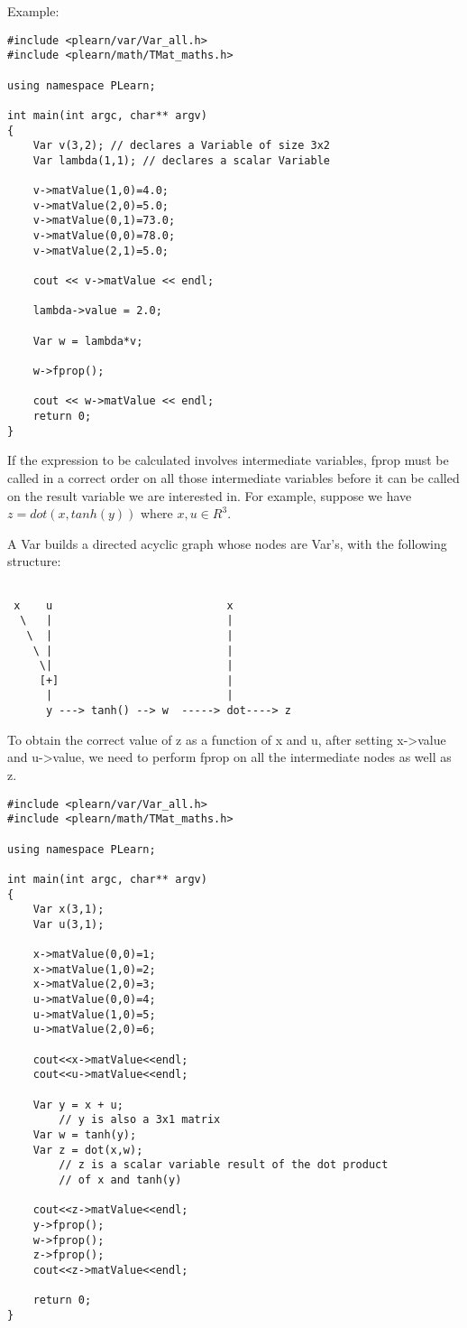 \documentclass[11pt]{book}
\begin{document}
 Example:

\begin{verbatim}
#include <plearn/var/Var_all.h>
#include <plearn/math/TMat_maths.h>

using namespace PLearn;

int main(int argc, char** argv)
{
    Var v(3,2); // declares a Variable of size 3x2
    Var lambda(1,1); // declares a scalar Variable

    v->matValue(1,0)=4.0;
    v->matValue(2,0)=5.0;
    v->matValue(0,1)=73.0;
    v->matValue(0,0)=78.0;
    v->matValue(2,1)=5.0;

    cout << v->matValue << endl;

    lambda->value = 2.0;

    Var w = lambda*v;

    w->fprop();

    cout << w->matValue << endl;
    return 0;
}
\end{verbatim}


If the expression to be calculated involves intermediate variables,
fprop must be called in a correct order on all those intermediate
variables before it can be called on the result variable we are
interested in. For example, suppose we have $z=dot(x,tanh(y))$ where
$x,u \in R^3$.


 A Var builds a directed acyclic graph whose nodes are Var's, with the
following structure:
\nopagebreak
\begin{verbatim}

 x    u                           x
  \   |                           |   
   \  |                           |  
    \ |                           |  
     \|                           |  
     [+]                          |
      |                           |           
      y ---> tanh() --> w  -----> dot----> z

\end{verbatim}

To obtain the correct value of z as a function of x and u, after setting
x->value and u->value, we need to perform fprop on all the intermediate
nodes as well as z.

\begin{verbatim}
#include <plearn/var/Var_all.h>
#include <plearn/math/TMat_maths.h>

using namespace PLearn;

int main(int argc, char** argv)
{
    Var x(3,1);
    Var u(3,1);

    x->matValue(0,0)=1;
    x->matValue(1,0)=2;
    x->matValue(2,0)=3;
    u->matValue(0,0)=4;
    u->matValue(1,0)=5;
    u->matValue(2,0)=6;

    cout<<x->matValue<<endl;
    cout<<u->matValue<<endl;

    Var y = x + u;
        // y is also a 3x1 matrix
    Var w = tanh(y);
    Var z = dot(x,w);
        // z is a scalar variable result of the dot product 
        // of x and tanh(y)

    cout<<z->matValue<<endl;
    y->fprop();
    w->fprop();
    z->fprop();
    cout<<z->matValue<<endl;

    return 0;
}
\end{verbatim}
\end{document}
